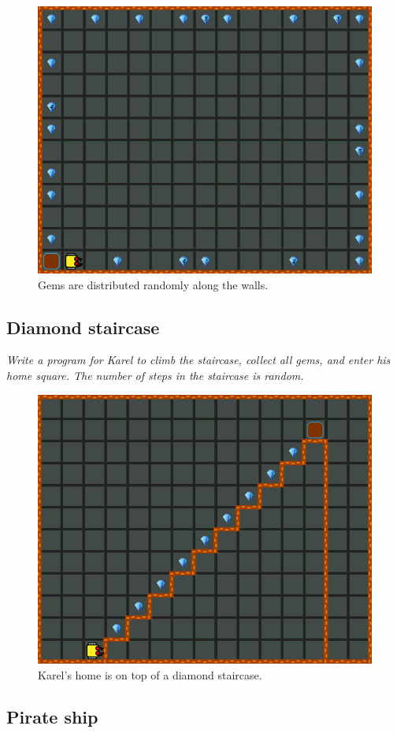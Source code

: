 \begin{figure}[!ht]
\begin{center}
\includegraphics[height=0.4\textwidth]{img/f10.png}
\end{center}
\vspace{-4mm}
\caption{Gems are distributed randomly along the walls.}
\label{fig:f10}
\end{figure}

\subsection{Diamond staircase}

{\em Write a program for Karel to climb the staircase, collect all gems, and enter his home square. The number of steps in the staircase is random.}

\begin{figure}[!ht]
\begin{center}
\includegraphics[height=0.4\textwidth]{img/f06.png}
\end{center}
\vspace{-4mm}
\caption{Karel's home is on top of a diamond staircase.}
\vspace{-4mm}
\label{fig:f06}
\end{figure}

\subsection{Pirate ship}

